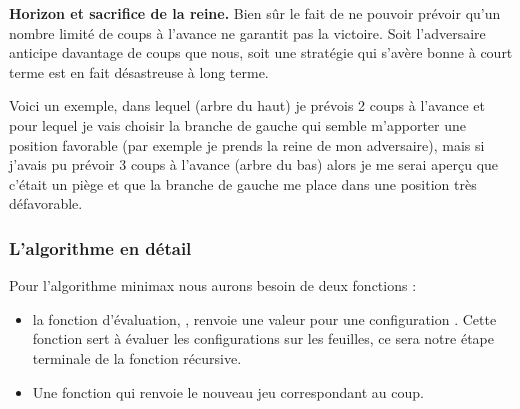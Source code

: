 \documentclass[11pt,class=report,crop=false]{standalone}
\begin{document}
\textbf{Horizon et sacrifice de la reine.}
Bien sûr le fait de ne pouvoir prévoir qu'un nombre limité de coups à l'avance ne garantit pas la victoire. Soit l'adversaire anticipe davantage de coups que nous, soit une stratégie qui s'avère bonne à court terme est en fait désastreuse à long terme.

Voici un exemple, dans lequel (arbre du haut) je prévois 2 coups à l'avance et pour lequel je vais choisir la branche de gauche qui semble m'apporter une position favorable (par exemple je prends la reine de mon adversaire), mais si j'avais pu prévoir 3 coups à l'avance (arbre du bas) alors je me serai aperçu que c'était un piège et que la branche de gauche me place dans une position très défavorable.






\subsubsection{L'algorithme en détail}

Pour l'algorithme minimax nous aurons besoin de deux fonctions :
\begin{itemize}
	\item la fonction d'évaluation, , renvoie une valeur pour une configuration . Cette fonction sert à évaluer les configurations sur les feuilles, ce sera notre étape terminale de la fonction récursive. 
	
	\item Une fonction  qui renvoie le nouveau jeu correspondant au coup.
\end{itemize}
\end{document}

